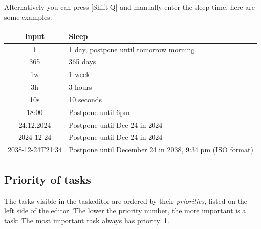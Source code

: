 \documentclass[12pt,a4paper]{article}
\newcommand{\key}[1]{[#1]}
\begin{document}
Alternatively you can press \key{Shift-Q} and manually enter the sleep time, here are some examples:

\begin{center}
    \begin{tabular}{|c|p{11cm}|} \hline
        {\bf Input }   & {\bf Sleep} \\ \hline
        1       & 1 day, postpone until tomorrow morning\\
        365     & 365 days \\
        1w      & 1 week \\
        3h      & 3 hours \\
        10s     & 10 seconds \\
        18:00   & Postpone until 6pm \\
        24.12.2024  & Postpone until Dec 24 in 2024 \\
        2024-12-24  & Postpone until Dec 24 in 2024 \\ 
        2038-12-24T21:34 &  Postpone until December 24 in 2038, 9:34 pm (ISO format)  \\ \hline
    \end{tabular}
\end{center}


\subsection{Priority of tasks}
The tasks visible in the taskeditor are ordered by their {\em
priorities}, listed on the left side of the editor. The lower the
priority number, the more important is a task: The most important task always has priority~1.
\end{document}
